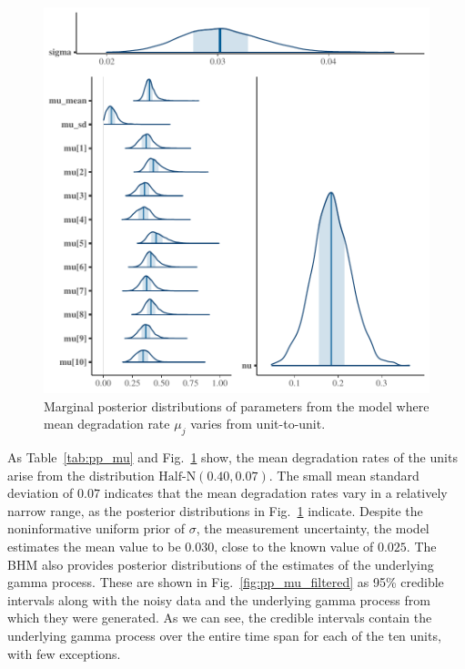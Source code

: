 \documentclass{article}
\begin{document}


\begin{figure}[t]
    \centering
    \includegraphics[width=0.8\columnwidth]{../figures/plot-pp-mu-marg-post-1.pdf}
    \caption{Marginal posterior distributions of parameters from the model where mean degradation rate $\mu_j$ varies from unit-to-unit.}
    \label{fig:pp_mu_marg}
\end{figure}

As Table~\ref{tab:pp_mu} and Fig.~\ref{fig:pp_mu_marg} show, the mean degradation rates of the units arise from the distribution $\mbox{Half-N}(0.40, 0.07)$. The small mean standard deviation of $0.07$ indicates that the mean degradation rates vary in a relatively narrow range, as the posterior distributions in Fig.~\ref{fig:pp_mu_marg} indicate. Despite the noninformative uniform prior of $\sigma$, the measurement uncertainty, the model estimates the mean value to be $0.030$, close to the known value of $0.025$. The BHM also provides posterior distributions of the estimates of the underlying gamma process. These are shown in Fig.~\ref{fig:pp_mu_filtered} as 95\% credible intervals along with the noisy data and the underlying gamma process from which they were generated. As we can see, the credible intervals contain the underlying gamma process over the entire time span for each of the ten units, with few exceptions. 
\end{document}
